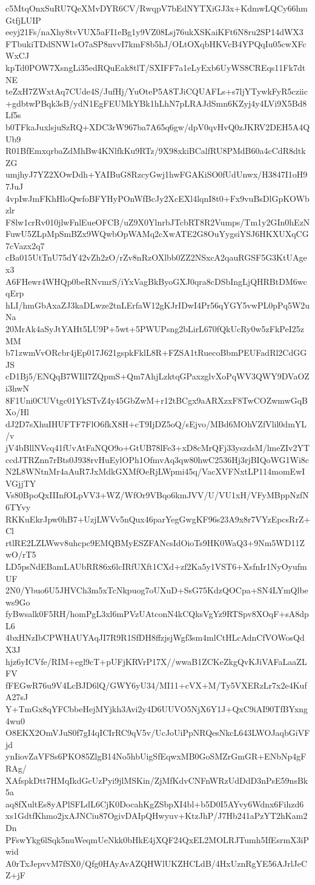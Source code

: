 c5MtqOnxSuRU7QeXMvDYR6CV/RwqpV7bEdNYTXiGJ3x+KdmwLQCy66hmGtfjLUIP
eeyj21Fs/naXhy8tvVUX5aFI1eBg1y9VZ08Lsj76ukXSKaiKFt6N8ru2SP14dWX3
FTbukiTDdSNW1sO7aSP8nvvI7kmF8b5hJ/OLtOXqbHKVcB4YPQqIu05cwXFcWxCJ
kpTd0POW7XsngLi35edRQuEak8tlT/SXIFF7a1eLyExb6UyWS8CREqs11Fk7dtNE
teZxH7ZWxtAq7CUde4S/JufHj/YuOteP5A8TJiCQUAFLs+s7ljYTywkFyR5cziic
+gdbtwPBqk3sB/ydN1EgFEUMkYBk1hLhN7pLRAJdSmn6KZyj4y4LVi9X5Bd8Lf5s
b0TFkaJuxlsjuSzRQ+XDC3rW967ba7A65q6gw/dpV0qvHvQ0zJKRV2DEH5A4QUb9
R01BfEmxqrbaZdMhBw4KNlfkKu9RTz/9X98xkiBCalfRU8PMdB60a4cCdR8dtkZG
umjhyJ7YZ2XOwDdh+YAIBuG8RzcyGwj1hwFGAKiSO0fUdUnwx/H3847I1oH97JuJ
4vpIwJmFKhHloQwfoBFYHyPOnWfBcJy2XcEXl4lqnI8t0+Fx9vuBsDlGpKOWbzlr
F8lw1crRv010jlwFnlEueOFCB/uZ9X0YlnrbJTcbRT8R2Vumps/Tm1y2GIn0hEzN
FuwU5ZLpMpSmBZx9WQwbOpWAMq2cXwATE2G8OuYygsiYSJ6HKXUXqCG7cVazx2q7
cBa015UtTnU75dY42vZh2zO/rZv8nRzOXlbb0ZZ2NSxcA2qauRGSF5G3KtUAgex3
A6FHewr4WHQp0beRNvmrS/iYxVagBkByoGXJ0qra8cDSbIngLjQHRBtDM6wcqErp
hLI/hmGbAxaZJ3kaDLwze2tnLErfaW12gKJrIDwI4Pr56qYGY5vwPL0pPq5W2uNa
20MrAk4aSyJtYAHt5LU9P+5wt+5PWUPsng2bLirL670fQkUcRy0w5zFkPeI25zMM
b71zwmVvORcbr4jEp017J621gspkFklL8R+FZSA1tRuecoBbmPEUFadRl2CdGGJS
cD1Bj5/ENQqB7WIlI7ZQpmS+Qm7AhjLzktqGPaxzglvXoPqWV3QWY9DVaOZi3hwN
8F1Uni0CUVtgc01YkSTvZ4y45GbZwM+r12tBCgx9aARXzxF8TwCOZwmwGqBXo/Hl
dJ2D7sXhuIHUFTF7FlO6fkX8H+cT9IjDZ5oQ/sEjvo/MBd6MOhVZfVlil0dmYL/v
jV4bBllNVcq41fUvAtFaNQO9o+GtUB78lFe3+xD8cMrQFj33yszdsM/lmeZIv2YT
ccdJTRZnn7rBts0J938rvHuEylOPh1OfmvAq3qw80hwC2536Hj3rjBIQoWG1Wi8c
N2L8WNtnMr4aAuR7JxMdkGXMfOeRjLWpmi45q/VacXVFNxtLP114momEwIVGjjTY
Vs80BpoQxIIInfOLpVV3+WZ/WfOr9VBqo6kmJVV/U/VU1xH/VFyMBppNzfN6TYvy
RKKuEkrJpw0hB7+UzjLWVv5nQux46parYegGwgKF96s23A9x8r7VYzEpcsRrZ+Cl
rtlRE2LZLWwv8uhcpc9EMQBMyESZFANcsIdOioTs9HK0WaQ3+9Nm5WD11ZwO/rT5
LD5psNdEBamLAUbRR86x6lcIRfUXft1CXd+zf2Ka5y1VST6+XsfnIr1NyOyufmUF
2N0/Ybuo6U5JHVCh3m5xTcNkpuog7oUXuD+SsG75KdzQOCpa+SN4LYmQlbews9Go
fyBwsalk0F5RH/homPgL3xl6mPVzUAtconN4kCQksVgYz9RTSpv8XOqF+sA8dpL6
4bxHNzIbCPWHAUYAqJI7R9R1SfDH8ffzjsjWgf3sm4mlCtHLcAdnCfVOWosQdX3J
hjz6yICVfe/RIM+egl9cT+pUFjKRVrP17X//wwaB1ZCKeZkgQvKJiVAFaLaaZLFV
fFEGwR76u9V4LcBJD6lQ/GWY6yU34/MI11+cVX+M/Ty5VXERzLr7x2e4KufA27sJ
Y+TmGx8qYFCbbeHejMYjkh3Avi2y4D6UUVO5NjX6Y1J+QxC9iAI90TfBYxng4wu0
O8EKX2OmVJuS0f7gI4qICIrRC9qV5v/UcJoUiPpNRQesNkcL643LWOJaqbGiVFjd
ynIiovZaVFSs6PKO85ZlgB14No5hbUigSfEqwxMB0GoSMZrGmGR+ENbNp4gFRAg/
XAfspkDtt7HMqIkdGcUzPyi9jlMSKin/ZjMfKdvCNFnWRzUdDdD3nPsE59nsBk5a
aq8fXultEs8yAPlSFLdL6CjK0DocahKgZSbpXI4bl+b5D0I5AYvy6Wdnx6Fihzd6
xs1GdtfKhmo2jxAJNCiu87OgivDAIpQHwyuv+KtzJhP/J7Hb241aPzYT2hKam2Dn
PFswYkg6lSqk5nuWeqmUeNkk0bHkE4jXQF24QxEL2MOLRJTumh5IfEsrmX3iPwid
A0rTxJepvvM7fSX0/Qfg0HAyAvAZQHWlUKZHCLdB/4HxUznRgYE56AJrlJeCZ+jF
